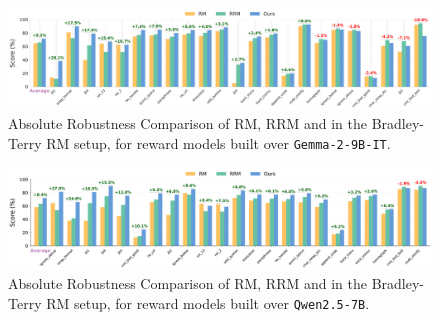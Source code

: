\begin{figure}[!htpb]
  \centering
  \includegraphics[width=0.9\columnwidth]{images/reword_absolute_robustness_gemma9b_bt_sorted.pdf}
  \caption{Absolute Robustness Comparison of RM, RRM and \carma{} in the Bradley-Terry RM setup, for reward models built over \texttt{Gemma-2-9B-IT}.}
  \label{fig:reword_absolute_robustness_gemma9b_bt}
  
\end{figure}

\begin{figure}[!htpb]
  \centering
  \includegraphics[width=0.9\columnwidth]{images/reword_absolute_robustness_qwen7b_bt_sorted.pdf}
  \caption{Absolute Robustness Comparison of RM, RRM and \carma{} in the Bradley-Terry RM setup, for reward models built over \texttt{Qwen2.5-7B}.}
  \label{fig:reword_absolute_robustness_qwen7b_bt}
  
\end{figure}